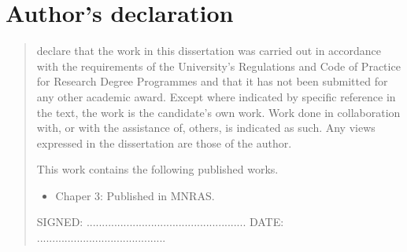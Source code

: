 %
%
%
%
%
%
\chapter*{Author's declaration}
\begin{SingleSpace}
\begin{quote}
 declare that the work in this dissertation was carried out in accordance with the requirements of  the University's Regulations and Code of Practice for Research Degree Programmes and that it  has not been submitted for any other academic award. Except where indicated by specific  reference in the text, the work is the candidate's own work. Work done in collaboration with, or with the assistance of, others, is indicated as such. Any views expressed in the dissertation are those of the author.

This work contains the following published works.
\begin{itemize}
    \item Chaper 3: Published in MNRAS.
\end{itemize}

\vspace{1.5cm}
\noindent
\hspace{-0.75cm}\textsc{SIGNED: .................................................... DATE: ..........................................}
\end{quote}
\end{SingleSpace}
\clearpage